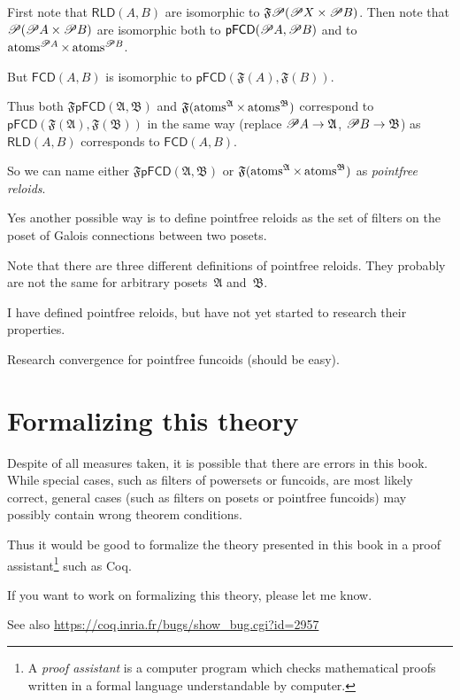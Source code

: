 First note that $\mathsf{RLD}(A,B)$ are isomorphic to $\mathfrak{F}\mathscr{P}(\mathscr{P} X\times\mathscr{P} B)$.
Then note that $\mathscr{P}(\mathscr{P} A\times\mathscr{P} B)$ are isomorphic
both to $\mathsf{pFCD}(\mathscr{P} A,\mathscr{P} B)$ and to $\operatorname{atoms}^{\mathscr{P} A}\times\operatorname{atoms}^{\mathscr{P} B}$.

But $\mathsf{FCD}(A,B)$ is isomorphic to $\mathsf{pFCD}(\mathfrak{F}(A),\mathfrak{F}(B))$.

Thus both $\mathfrak{F}\mathsf{pFCD}(\mathfrak{A},\mathfrak{B})$
and $\mathfrak{F}(\operatorname{atoms}^{\mathfrak{A}}\times\operatorname{atoms}^{\mathfrak{B}})$
correspond to $\mathsf{pFCD}(\mathfrak{F}(\mathfrak{A}),\mathfrak{F}(\mathfrak{B}))$
in the same way (replace $\mathscr{P} A\rightarrow\mathfrak{A}$, $\mathscr{P} B\rightarrow\mathfrak{B}$)
as $\mathsf{RLD}(A,B)$ corresponds to $\mathsf{FCD}(A,B)$.

So we can name either $\mathfrak{F}\mathsf{pFCD}(\mathfrak{A},\mathfrak{B})$
or $\mathfrak{F}(\operatorname{atoms}^{\mathfrak{A}}\times\operatorname{atoms}^{\mathfrak{B}})$
as \emph{pointfree reloids}.

Yes another possible way is to define pointfree reloids as the set of filters on the poset of Galois connections
between two posets.

Note that there are three different definitions of pointfree reloids.
They probably are not the same for arbitrary posets~$\mathfrak{A}$
and~$\mathfrak{B}$.

I have defined pointfree reloids, but have not yet started to research
their properties.

Research convergence for pointfree funcoids (should be easy).


\section{Formalizing this theory}

Despite of all measures taken, it is possible that there are errors
in this book. While special cases, such as filters of powersets or
funcoids, are most likely correct, general cases (such as filters
on posets or pointfree funcoids) may possibly contain wrong theorem
conditions.

Thus it would be good to formalize the theory presented in this book
in a proof assistant\footnote{A \emph{proof assistant} is a computer program which checks mathematical
proofs written in a formal language understandable by computer.} such as Coq.

If you want to work on formalizing this theory, please let me know.

See also \href{https://coq.inria.fr/bugs/show_bug.cgi?id=2957}{https://coq.inria.fr/bugs/show\_{}bug.cgi?id=2957}
